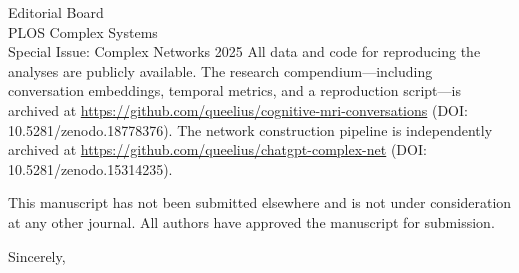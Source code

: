\documentclass[11pt]{letter}
\begin{document}
\begin{letter}{Editorial Board\\
PLOS Complex Systems\\
Special Issue: Complex Networks 2025}
All data and code for reproducing the analyses are publicly available. The research compendium---including conversation embeddings, temporal metrics, and a reproduction script---is archived at \url{https://github.com/queelius/cognitive-mri-conversations} (DOI: 10.5281/zenodo.18778376). The network construction pipeline is independently archived at \url{https://github.com/queelius/chatgpt-complex-net} (DOI: 10.5281/zenodo.15314235).

This manuscript has not been submitted elsewhere and is not under consideration at any other journal. All authors have approved the manuscript for submission.

\closing{Sincerely,}

\end{letter}
\end{document}
